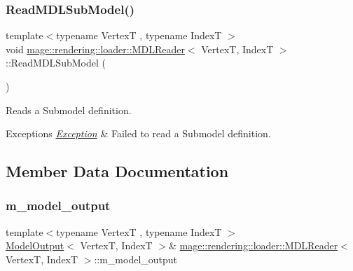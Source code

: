 \subsubsection{\texorpdfstring{Read\+M\+D\+L\+Sub\+Model()}{ReadMDLSubModel()}}
{\footnotesize\ttfamily template$<$typename VertexT , typename IndexT $>$ \\
void \hyperlink{classmage_1_1rendering_1_1loader_1_1_m_d_l_reader}{mage\+::rendering\+::loader\+::\+M\+D\+L\+Reader}$<$ VertexT, IndexT $>$\+::Read\+M\+D\+L\+Sub\+Model (\begin{DoxyParamCaption}{ }\end{DoxyParamCaption})\hspace{0.3cm}{\ttfamily [private]}}

Reads a Submodel definition.


\begin{DoxyExceptions}{Exceptions}
{\em \hyperlink{classmage_1_1_exception}{Exception}} & Failed to read a Submodel definition. \\
\hline
\end{DoxyExceptions}


\subsection{Member Data Documentation}
\hypertarget{classmage_1_1rendering_1_1loader_1_1_m_d_l_reader_aab6301fae258aaea1619856000a29e53}{}\label{classmage_1_1rendering_1_1loader_1_1_m_d_l_reader_aab6301fae258aaea1619856000a29e53} 
\subsubsection{\texorpdfstring{m\+\_\+model\+\_\+output}{m\_model\_output}}
{\footnotesize\ttfamily template$<$typename VertexT , typename IndexT $>$ \\
\hyperlink{structmage_1_1rendering_1_1_model_output}{Model\+Output}$<$ VertexT, IndexT $>$\& \hyperlink{classmage_1_1rendering_1_1loader_1_1_m_d_l_reader}{mage\+::rendering\+::loader\+::\+M\+D\+L\+Reader}$<$ VertexT, IndexT $>$\+::m\+\_\+model\+\_\+output\hspace{0.3cm}{\ttfamily [private]}}

